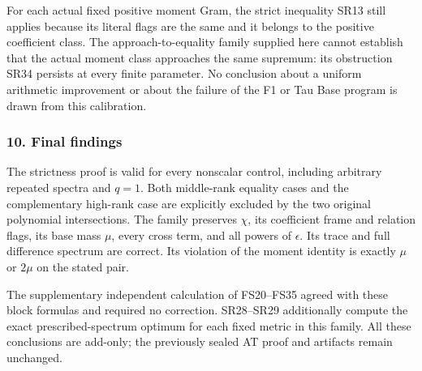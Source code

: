 For each actual fixed positive moment Gram, the strict inequality SR13 still applies because its literal flags are the same and it belongs to the positive coefficient class. The approach-to-equality family supplied here cannot establish that the actual moment class approaches the same supremum: its obstruction SR34 persists at every finite parameter. No conclusion about a uniform arithmetic improvement or about the failure of the F1 or Tau Base program is drawn from this calibration.

\subsubsection{10. Final findings}\label{endpoint-four_window_sharpness_review--final-findings}

The strictness proof is valid for every nonscalar control, including arbitrary repeated spectra and \(q=1\). Both middle-rank equality cases and the complementary high-rank case are explicitly excluded by the two original polynomial intersections. The family preserves \(\chi\), its coefficient frame and relation flags, its base mass \(\mu\), every cross term, and all powers of \(\epsilon\). Its trace and full difference spectrum are correct. Its violation of the moment identity is exactly \(\mu\) or \(2\mu\) on the stated pair.

The supplementary independent calculation of FS20--FS35 agreed with these block formulas and required no correction. SR28--SR29 additionally compute the exact prescribed-spectrum optimum for each fixed metric in this family. All these conclusions are add-only; the previously sealed AT proof and artifacts remain unchanged.

\endgroup


\endgroup
